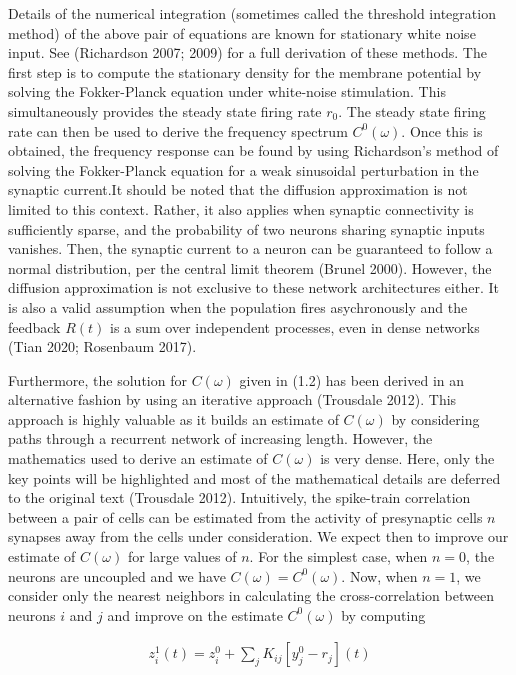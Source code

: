 \documentclass{ucetd}
\begin{document}
Details of the numerical integration (sometimes called the threshold integration method) of the above pair of equations are known for stationary white noise input. See (Richardson 2007; 2009) for a full derivation of these methods. The first step is to compute the stationary density for the membrane potential by solving the Fokker-Planck equation under white-noise stimulation. This simultaneously provides the steady state firing rate $r_{0}$. The steady state firing rate can then be used to derive the frequency spectrum $C^{0}(\omega)$. Once this is obtained, the frequency response can be found by using Richardson's method of solving the Fokker-Planck equation for a weak sinusoidal perturbation in the synaptic current.It should be noted that the diffusion approximation is not limited to this context. Rather, it also applies when synaptic connectivity is sufficiently sparse, and the probability of two neurons sharing synaptic inputs vanishes. Then, the synaptic current to a neuron can be guaranteed to follow a normal distribution, per the central limit theorem (Brunel 2000). However, the diffusion approximation is not exclusive to these network architectures either. It is also a valid assumption when the population fires asychronously and the feedback $R(t)$ is a sum over independent processes, even in dense networks (Tian 2020; Rosenbaum 2017).

Furthermore, the solution for $C(\omega)$ given in (1.2) has been derived in an alternative fashion by using an iterative approach (Trousdale 2012). This approach is highly valuable as it builds an estimate of $C(\omega)$ by considering paths through a recurrent network of increasing length. However, the mathematics used to derive an estimate of $C(\omega)$ is very dense. Here, only the key points will be highlighted and most of the mathematical details are deferred to the original text (Trousdale 2012). Intuitively, the spike-train correlation between a pair of cells can be estimated from the activity of presynaptic cells $n$ synapses away from the cells under consideration. We expect then to improve our estimate of $C(\omega)$ for large values of $n$. For the simplest case, when $n=0$, the neurons are uncoupled and we have $C(\omega) = C^{0}(\omega)$. Now, when $n=1$, we consider only the nearest neighbors in calculating the cross-correlation between neurons $i$ and $j$ and improve on the estimate $C^{0}(\omega)$ by computing

\begin{align}
z_{i}^{1}(t) = z_{i}^{0} + \sum_{j}K_{ij}[y_{j}^{0}-r_{j}](t)
\end{align} 
\end{document}
